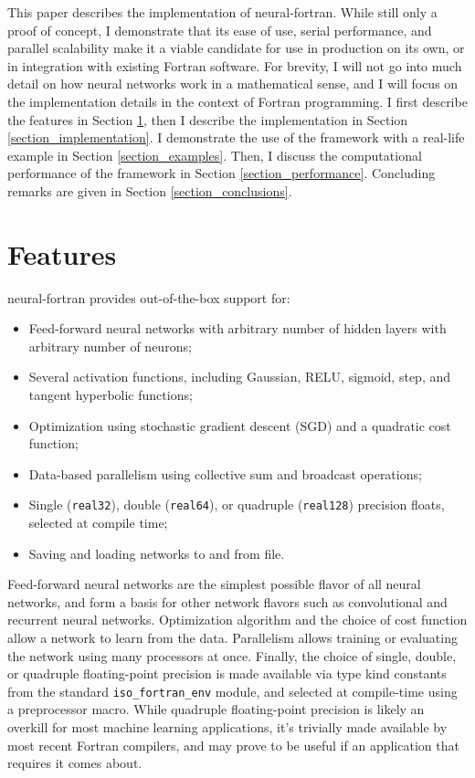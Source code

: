 \documentclass[sigplan, review=false, screen=true, balance=true]{acmart}
\begin{document}
This paper describes the implementation of neural-fortran. While still only a
proof of concept, I demonstrate that its ease of use, serial performance, and
parallel scalability make it a viable candidate for use in production on its
own, or in integration with existing Fortran software. For brevity, I will not
go into much detail on how neural networks work in a mathematical sense, and I
will focus on the implementation details in the context of Fortran programming.
I first describe the features in Section \ref{section_features}, then I describe
the implementation in Section \ref{section_implementation}. I demonstrate the
use of the framework with a real-life example in Section \ref{section_examples}.
Then, I discuss the computational performance of the framework in Section
\ref{section_performance}. Concluding remarks are given in Section
\ref{section_conclusions}.

\section{Features} \label{section_features}

neural-fortran provides out-of-the-box support for:

\begin{itemize}
  \item Feed-forward neural networks with arbitrary number of hidden layers with
  arbitrary number of neurons;
  \item Several activation functions, including Gaussian, RELU, sigmoid, step,
  and tangent hyperbolic functions;
  \item Optimization using stochastic gradient descent (SGD) \citep{rumelhart86}
  and a quadratic cost function;
  \item Data-based parallelism using collective sum and broadcast operations;
  \item Single (\lstinline{real32}), double (\lstinline{real64}), or quadruple
  (\lstinline{real128}) precision floats, selected at compile time;
  \item Saving and loading networks to and from file.
\end{itemize}

Feed-forward neural networks are the simplest possible flavor of all neural
networks, and form a basis for other network flavors such as convolutional
\citep{krizhevsky12} and recurrent \citep{hochreiter97} neural networks.
Optimization algorithm and the choice of cost function allow a network
to learn from the data. Parallelism allows training or evaluating the
network using many processors at once.
Finally, the choice of single, double, or quadruple floating-point
precision is made available via type kind constants from the 
standard \lstinline{iso_fortran_env} module, and selected at 
compile-time using a preprocessor macro. 
While quadruple floating-point precision is likely an overkill
for most machine learning applications, it's trivially made 
available by most recent Fortran compilers, and may prove to 
be useful if an application that requires it comes about.
\end{document}

